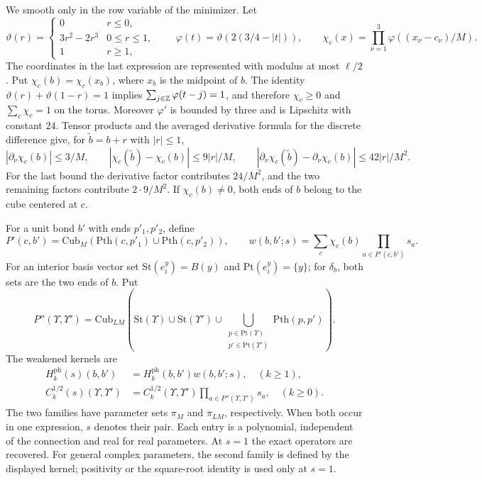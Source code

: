 We smooth only in the row variable of the minimizer. Let
\[
 \vartheta(r)=
 \begin{cases}0&r\le0,\\3r^2-2r^3&0\le r\le1,\\1&r\ge1,
 \end{cases}
 \qquad
 \varphi(t)=\vartheta(2(3/4-|t|)),
 \qquad
 \chi_c(x)=\prod_{\nu=1}^3\varphi((x_\nu-c_\nu)/M).
\]
The coordinates in the last expression are represented with
modulus at most $\ell/2$. Put $\chi_c(b)=\chi_c(x_b)$, where
$x_b$ is the midpoint of $b$. The identity
$\vartheta(r)+\vartheta(1-r)=1$ implies
$\sum_{j\in\mathbb Z}\varphi(t-j)=1$, and therefore
$\chi_c\ge0$ and $\sum_c\chi_c=1$ on the torus.
Moreover $\varphi'$ is bounded by three and is Lipschitz with
constant $24$. Tensor products and the averaged derivative
formula for the discrete difference give, for $\tilde b=b+r$
with $|r|\le1$,
\begin{equation}\label{eq:photon-cutoff-differences}
 |\partial_\nu\chi_c(b)|\le3/M,\qquad
 |\chi_c(\tilde b)-\chi_c(b)|\le9|r|/M,\qquad
 |\partial_\nu\chi_c(\tilde b)-\partial_\nu\chi_c(b)|
                                                     \le42|r|/M^2.
\end{equation}
For the last bound the derivative factor contributes $24/M^2$,
and the two remaining factors contribute $2\cdot9/M^2$.
If $\chi_c(b)\ne0$, both ends of $b$ belong to the cube centered
at $c$.

For a unit bond $b'$ with ends $p'_1,p'_2$, define
\[
 P'(c,b')=\mathrm{Cub}_M
                 (\mathrm{Pth}(c,p'_1)\cup\mathrm{Pth}(c,p'_2)),
 \qquad
 w(b,b';s)=\sum_c\chi_c(b)\prod_{a\in P'(c,b')}s_a.
\]
For an interior basis vector set
$\mathrm{St}(e_i^y)=B(y)$ and $\mathrm{Pt}(e_i^y)=\{y\}$;
for $\delta_b$, both sets are the two ends of $b$. Put
\[
 P''(\Upsilon,\Upsilon')=\mathrm{Cub}_{LM}
 \left(\mathrm{St}(\Upsilon)\cup\mathrm{St}(\Upsilon')
 \cup\!\!\bigcup_{\substack{p\in\mathrm{Pt}(\Upsilon)\\
                           p'\in\mathrm{Pt}(\Upsilon')}}
                                  \mathrm{Pth}(p,p')\right).
\]
The weakened kernels are
\begin{equation}\label{eq:photon-weakened-definitions}
 \begin{split}
 H_k^{\mathrm{ph}}(s)(b,b')&=H_k^{\mathrm{ph}}(b,b')w(b,b';s),
                                                  \quad(k\ge1),\\
 C_k^{1/2}(s)(\Upsilon,\Upsilon')
    &=C_k^{1/2}(\Upsilon,\Upsilon')
                         \prod_{a\in P''(\Upsilon,\Upsilon')}s_a,
                                                  \quad(k\ge0).
 \end{split}
\end{equation}
The two families have parameter sets $\pi_M$ and $\pi_{LM}$,
respectively. When both occur in one expression, $s$ denotes
their pair. Each entry is a polynomial, independent of the
connection and real for real parameters. At $s=1$ the exact
operators are recovered. For general complex parameters, the
second family is defined by the displayed kernel; positivity
or the square-root identity is used only at $s=1$.

